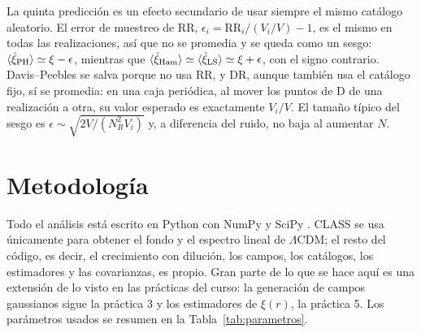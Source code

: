 \documentclass[letterpaper, 12pt]{article}
\newcommand{\DR}{\mathrm{DR}}
\newcommand{\RR}{\mathrm{RR}}
\newcommand{\LCDM}{\Lambda\mathrm{CDM}}
\begin{document}
            La quinta predicción es un efecto secundario de usar siempre el mismo catálogo aleatorio. El error de muestreo de $\RR$, $\epsilon_i = \RR_i/(V_i/V) - 1$, es el mismo en todas las realizaciones, así que no se promedia y se queda como un sesgo: $\langle\hat\xi_{\rm PH}\rangle \simeq \xi - \epsilon$, mientras que $\langle\hat\xi_{\rm Ham}\rangle \simeq \langle\hat\xi_{\rm LS}\rangle \simeq \xi + \epsilon$, con el signo contrario. Davis--Peebles se salva porque no usa $\RR$, y $\DR$, aunque también usa el catálogo fijo, sí se promedia: en una caja periódica, al mover los puntos de D de una realización a otra, su valor esperado es exactamente $V_i/V$. El tamaño típico del sesgo es $\epsilon \sim \sqrt{2V/(N_R^2V_i)}$ y, a diferencia del ruido, no baja al aumentar $N$.

    \section{Metodología}\label{sec:metodologia}

        Todo el análisis está escrito en Python con NumPy \cite{numpy} y SciPy \cite{scipy}. CLASS \cite{class} se usa únicamente para obtener el fondo y el espectro lineal de $\LCDM$; el resto del código, es decir, el crecimiento con dilución, los campos, los catálogos, los estimadores y las covarianzas, es propio. Gran parte de lo que se hace aquí es una extensión de lo visto en las prácticas del curso: la generación de campos gaussianos sigue la práctica 3 y los estimadores de $\xi(r)$, la práctica 5. Los parámetros usados se resumen en la Tabla~\ref{tab:parametros}.
\end{document}

